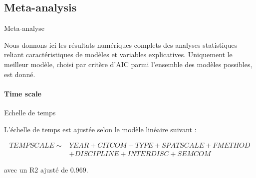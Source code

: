 \subsection{Meta-analysis}{Meta-analyse}

Nous donnons ici les résultats numériques complets des analyses statistiques reliant caractéristiques de modèles et variables explicatives. Uniquement le meilleur modèle, choisi par critère d'AIC parmi l'ensemble des modèles possibles, est donné.

\paragraph{Time scale}{Echelle de temps}

L'échelle de temps est ajustée selon le modèle linéaire suivant :

\[
\begin{split}
	TEMPSCALE \sim & YEAR+CITCOM+TYPE+SPATSCALE+FMETHOD\\
	& +DISCIPLINE+INTERDISC+SEMCOM
\end{split}
\]


avec un R2 ajusté de 0.969.


